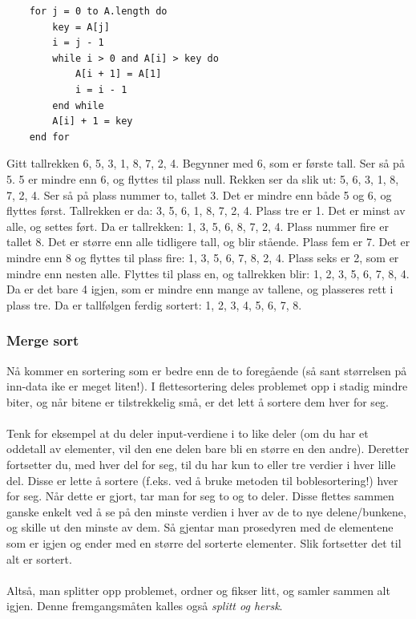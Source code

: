 \begin{lstlisting}
    for j = 0 to A.length do
	    key = A[j]
	    i = j - 1
	    while i > 0 and A[i] > key do
	    	A[i + 1] = A[1]
	    	i = i - 1
	    end while
	    A[i] + 1 = key
    end for
\end{lstlisting}

\begin{boxed}
Gitt tallrekken 6, 5, 3, 1, 8, 7, 2, 4. Begynner med 6, som er første tall. Ser så på 5. 5 er mindre enn 6, og flyttes til plass null. Rekken ser da slik ut: 5, 6, 3, 1, 8, 7, 2, 4. Ser så på plass nummer to, tallet 3. Det er mindre enn både 5 og 6, og flyttes først. Tallrekken er da: 3, 5, 6, 1, 8, 7, 2, 4. Plass tre er 1. Det er minst av alle, og settes ført. Da er tallrekken: 1, 3, 5, 6, 8, 7, 2, 4. Plass nummer fire er tallet 8. Det er større enn alle tidligere tall, og blir stående. Plass fem er 7. Det er mindre enn 8 og flyttes til plass fire: 1, 3, 5, 6, 7, 8, 2, 4. Plass seks er 2, som er mindre enn nesten alle. Flyttes til plass en, og tallrekken blir: 1, 2, 3, 5, 6, 7, 8, 4. Da er det bare 4 igjen, som er mindre enn mange av tallene, og plasseres rett i plass tre. Da er tallfølgen ferdig sortert: 1, 2, 3, 4, 5, 6, 7, 8.
\end{boxed}

\subsubsection{Merge sort}
Nå kommer en sortering som er bedre enn de to foregående (så sant størrelsen på inn-data ike er meget liten!). I flettesortering deles problemet opp i stadig mindre biter, og når bitene er tilstrekkelig små, er det lett å sortere dem hver for seg.
\\\\
Tenk for eksempel at du deler input-verdiene i to like deler (om du har et oddetall av elementer, vil den ene delen bare bli en større en den andre). Deretter fortsetter du, med hver del for seg, til du har kun to eller tre verdier i hver lille del. Disse er lette å sortere (f.eks. ved å bruke metoden til boblesortering!) hver for seg. Når dette er gjort, tar man for seg to og to deler. Disse flettes sammen ganske enkelt ved å se på den minste verdien i hver av de to nye delene/bunkene, og skille ut den minste av dem. Så gjentar man prosedyren med de elementene som er igjen og ender med en større del sorterte elementer. Slik fortsetter det til alt er sortert.
\\\\
Altså, man splitter opp problemet, ordner og fikser litt, og samler sammen alt igjen. Denne fremgangsmåten kalles også \textit{splitt og hersk}.

